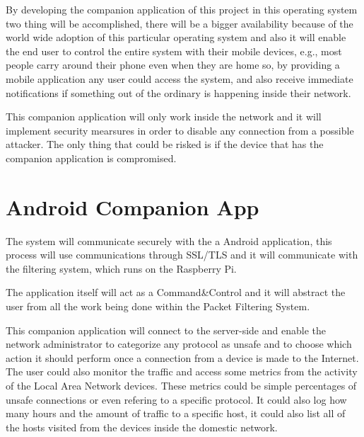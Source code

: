 By developing the companion application of this project in this operating system
two thing will be accomplished, there will be a bigger availability because of
the world wide adoption of this particular operating system and also it will
enable the end user to control the entire system with their mobile devices,
e.g., most people carry around their phone even when they are home so, by
providing a mobile application any user could access the system, and also
receive immediate notifications if something out of the ordinary is happening
inside their network.

This companion application will only work inside the network and it will
implement security mearsures in order to disable any connection from a possible
attacker. The only thing that could be risked is if the device that has the
companion application is compromised.

\section{Android Companion App}
\label{chap3:sec:aca}
The system will communicate securely with the a Android application, this
process will use communications through SSL/TLS and it will communicate with
the filtering system, which runs on the Raspberry Pi.

The application itself will act as a Command\&Control and it will abstract the
user from all the work being done within the Packet Filtering System.

This companion application will connect to the server-side and enable the
network administrator to categorize any protocol as unsafe and to choose which
action it should perform once a connection from a device is made to the
Internet. The user could also monitor the traffic and access some metrics from
the activity of the Local Area Network devices. These metrics could be simple
percentages of unsafe connections or even refering to a specific protocol. It
could also log how many hours and the amount of traffic to a specific host, it
could also list all of the hosts visited from the devices inside the domestic
network.


